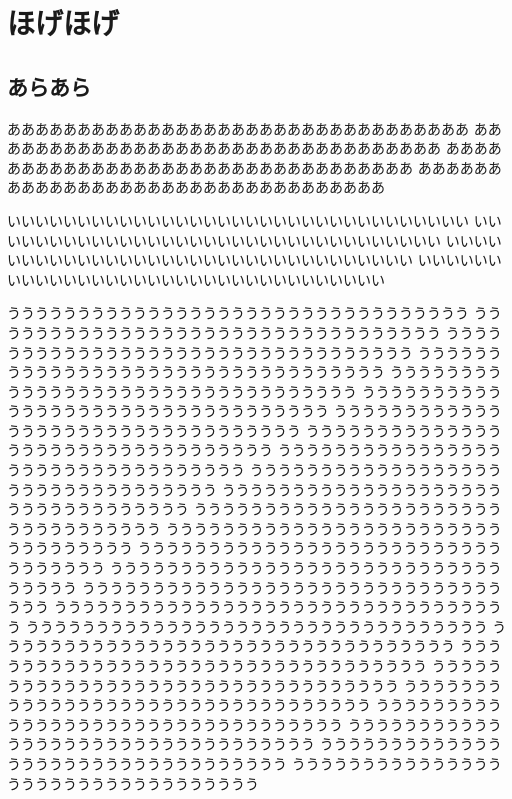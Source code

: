 \documentclass{jbook}
\begin{document}
\chapter{ほげほげ}
\section{あらあら}
あああああああああああああああああああああああああああああああああ
あああああああああああああああああああああああああああああああああ
あああああああああああああああああああああああああああああああああ
あああああああああああああああああああああああああああああああああ

いいいいいいいいいいいいいいいいいいいいいいいいいいいいいいいいい
いいいいいいいいいいいいいいいいいいいいいいいいいいいいいいいいい
いいいいいいいいいいいいいいいいいいいいいいいいいいいいいいいいい
いいいいいいいいいいいいいいいいいいいいいいいいいいいいいいいいい

ううううううううううううううううううううううううううううううううう
ううううううううううううううううううううううううううううううううう
ううううううううううううううううううううううううううううううううう
ううううううううううううううううううううううううううううううううう
ううううううううううううううううううううううううううううううううう
ううううううううううううううううううううううううううううううううう
ううううううううううううううううううううううううううううううううう
ううううううううううううううううううううううううううううううううう
ううううううううううううううううううううううううううううううううう
ううううううううううううううううううううううううううううううううう
ううううううううううううううううううううううううううううううううう
ううううううううううううううううううううううううううううううううう
ううううううううううううううううううううううううううううううううう
ううううううううううううううううううううううううううううううううう
ううううううううううううううううううううううううううううううううう
ううううううううううううううううううううううううううううううううう
ううううううううううううううううううううううううううううううううう
ううううううううううううううううううううううううううううううううう
ううううううううううううううううううううううううううううううううう
ううううううううううううううううううううううううううううううううう
ううううううううううううううううううううううううううううううううう
ううううううううううううううううううううううううううううううううう
ううううううううううううううううううううううううううううううううう
ううううううううううううううううううううううううううううううううう
ううううううううううううううううううううううううううううううううう
ううううううううううううううううううううううううううううううううう
\end{document}
